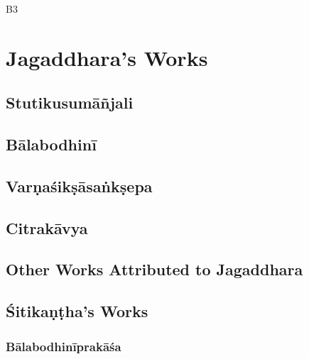 \gls{B3}

\section{Jagaddhara's Works}

\subsection{Stutikusumāñjali}

\subsection{Bālabodhinī}

\subsection{Varṇaśikṣāsaṅkṣepa}

\subsection{Citrakāvya}

\subsection{Other Works Attributed to Jagaddhara}

\subsection{Śitikaṇṭha's Works}

\subsubsection{Bālabodhinīprakāśa}

